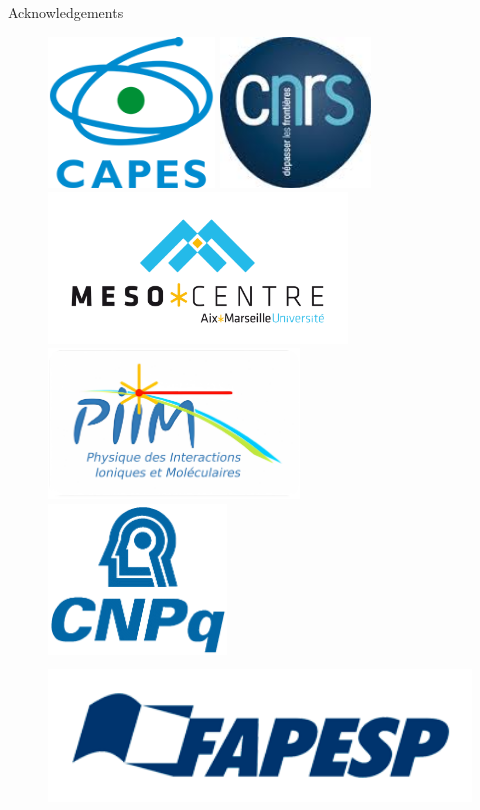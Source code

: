 \documentclass[final]{beamer}
\newlength{\colwidth}
\begin{document}
\begin{frame}[t]
\begin{columns}[t]
\begin{column}{\colwidth}
\begin{block}{Acknowledgements}
  \begin{figure}
      \centering
      \includegraphics[height = 4cm]{logos/capes logo.png}
      \includegraphics[height = 4cm]{logos/Logo-CNRS.png}
      \includegraphics[height = 4cm]{logos/mesocentre.png}
      \includegraphics[height = 4cm]{logos/PIIM_redondo(1).png}
      \includegraphics[height = 4cm]{logos/cnpq.png}
      \includegraphics[height = 4cm]{logos/fapesp.png}

\end{figure}
\end{block}
\end{column}
\end{columns}
\end{frame}
\end{document}
